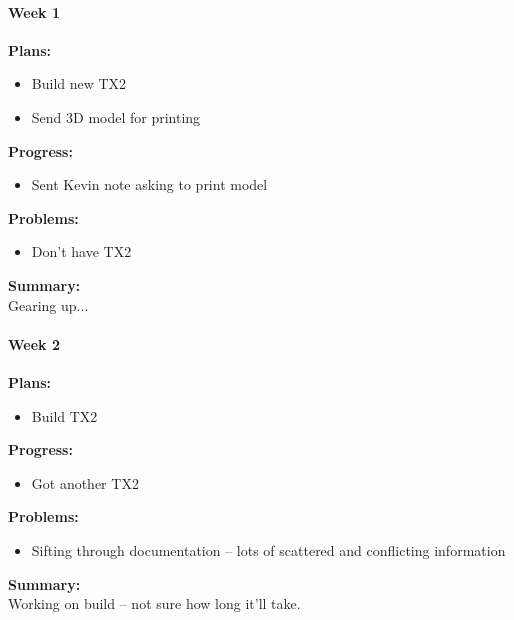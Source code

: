 \paragraph{Week 1}
\begin{adjustwidth}{2.5em}{0pt}
    \vspace{-0.5cm}\textbf{Plans:}
    \vspace{-0.5cm}
    \begin{itemize}
        \item Build new TX2
        \item Send 3D model for printing
    \end{itemize} 
    \vspace{-0.3cm}\textbf{Progress:}
    \vspace{-0.5cm}
    \begin{itemize}
        \item Sent Kevin note asking to print model
    \end{itemize} 
    \vspace{-0.3cm}\textbf{Problems:}
    \vspace{-0.5cm}
    \begin{itemize}
        \item Don't have TX2
    \end{itemize}  
    \vspace{-0.3cm}\noindent\textbf{Summary:}\\
    \noindent 
    Gearing up...
\end{adjustwidth}

\paragraph{Week 2}
\begin{adjustwidth}{2.5em}{0pt}
    \vspace{-0.5cm}\textbf{Plans:}
    \vspace{-0.5cm}
    \begin{itemize}
        \item  Build TX2
    \end{itemize} 
    \vspace{-0.3cm}\textbf{Progress:}
    \vspace{-0.5cm}
    \begin{itemize}
        \item Got another TX2
    \end{itemize} 
    \vspace{-0.3cm}\textbf{Problems:}
    \vspace{-0.5cm}
    \begin{itemize}
        \item Sifting through documentation -- lots of scattered and conflicting information
    \end{itemize}  
    \vspace{-0.3cm}\noindent\textbf{Summary:}\\
    \noindent 
    Working on build -- not sure how long it'll take.
\end{adjustwidth}

